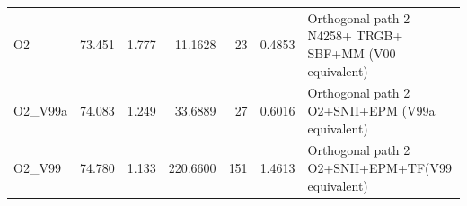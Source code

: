 \begin{table}
\begin{center}
\begin{tabular}{lccrrrl}
 O2 & 73.451 & 1.777 & 11.1628 & 23 & 0.4853 & %
                                  Orthogonal path 2 N4258+
TRGB+
SBF+MM (V00 equivalent) \\ 
 O2\_V99a & 74.083 & 1.249 & 33.6889 & 27 & 0.6016 & %
                                  Orthogonal path 2 O2+SNII+EPM (V99a equivalent) \\
 O2\_V99 & 74.780 & 1.133 & 220.6600 & 151 & 1.4613 & %
                                  Orthogonal path 2 O2+SNII+EPM+TF(V99 equivalent) \\
\hline\hline
        \end{tabular}
    \end{center}
\end{table}
